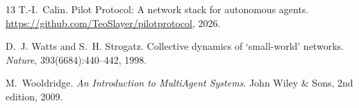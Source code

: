 \documentclass[11pt,twocolumn]{article}
\begin{document}
\begin{thebibliography}{13}
T.-I.~Calin.
\newblock Pilot Protocol: A network stack for autonomous agents.
\newblock \url{https://github.com/TeoSlayer/pilotprotocol}, 2026.

D.~J. Watts and S.~H. Strogatz.
\newblock Collective dynamics of `small-world' networks.
\newblock \emph{Nature}, 393(6684):440--442, 1998.

M.~Wooldridge.
\newblock \emph{An Introduction to MultiAgent Systems}.
\newblock John Wiley \& Sons, 2nd edition, 2009.

\end{thebibliography}
\end{document}
